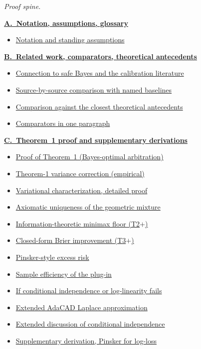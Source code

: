 \begin{tcolorbox}[colback=white,colframe=black,boxrule=0.5pt,arc=1pt,
  title=\textbf{Appendix: organisation and reading order (clickable)},
  fonttitle=\bfseries,coltitle=black,colbacktitle=white,
  before skip=4pt,after skip=4pt,breakable]
{\footnotesize
\setlength{\parskip}{2pt}

\textit{Proof spine.}

\textbf{\hyperref[app:letter-A]{A.\ Notation, assumptions, glossary}}
\begin{itemize}
  \item \hyperref[app:notation]{Notation and standing assumptions}
\end{itemize}

\textbf{\hyperref[app:letter-B]{B.\ Related work, comparators, theoretical antecedents}}
\begin{itemize}
  \item \hyperref[app:safe-bayes-connection]{Connection to safe Bayes and the calibration literature}
  \item \hyperref[app:baseline-deep-dive]{Source-by-source comparison with named baselines}
  \item \hyperref[app:antecedent-comparison]{Comparison against the closest theoretical antecedents}
  \item \hyperref[app:long-rw]{Comparators in one paragraph}
\end{itemize}

\textbf{\hyperref[app:letter-C]{C.\ Theorem~1 proof and supplementary derivations}}
\begin{itemize}
  \item \hyperref[app:thm1]{Proof of Theorem~1 (Bayes-optimal arbitration)}
  \item \hyperref[app:t1-variance-correction]{Theorem-1 variance correction (empirical)}
  \item \hyperref[app:variational-detail]{Variational characterization, detailed proof}
  \item \hyperref[app:thm1-axiomatic]{Axiomatic uniqueness of the geometric mixture}
  \item \hyperref[app:thm2-info]{Information-theoretic minimax floor (T2$+$)}
  \item \hyperref[app:thm3-intervention]{Closed-form Brier improvement (T3$+$)}
  \item \hyperref[app:pinsker-detail]{Pinsker-style excess risk}
  \item \hyperref[app:sample-efficiency]{Sample efficiency of the plug-in}
  \item \hyperref[app:ci-failure]{If conditional independence or log-linearity fails}
  \item \hyperref[app:adacad-extended]{Extended AdaCAD Laplace approximation}
  \item \hyperref[app:ci-extended]{Extended discussion of conditional independence}
  \item \hyperref[app:pinsker-logloss]{Supplementary derivation, Pinsker for log-loss}
\end{itemize}

}
\end{tcolorbox}
